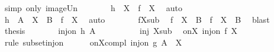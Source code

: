 \begin{isabellebody}
\ {\isacharparenleft}{\kern0pt}simp\ only{\isacharcolon}{\kern0pt}\ image{\isacharunderscore}{\kern0pt}Un{\isacharparenright}{\kern0pt}\isanewline
\ \ \ \ \isamarkupfalse%
\ \isamarkupfalse%
\ {\isachardoublequoteopen}{\isacharquery}{\kern0pt}h\ {\isacharbackquote}{\kern0pt}\ X\ {\isacharequal}{\kern0pt}\ f\ {\isacharbackquote}{\kern0pt}\ X{\isachardoublequoteclose}\ \isamarkupfalse%
\ auto\isanewline
\ \ \ \ \isamarkupfalse%
\ \isamarkupfalse%
\ {\isacharasterisk}{\kern0pt}\ \isamarkupfalse%
\ {\isachardoublequoteopen}{\isacharquery}{\kern0pt}h\ {\isacharbackquote}{\kern0pt}\ {\isacharparenleft}{\kern0pt}A\ {\isacharminus}{\kern0pt}\ X{\isacharparenright}{\kern0pt}\ {\isacharequal}{\kern0pt}\ B\ {\isacharminus}{\kern0pt}\ {\isacharparenleft}{\kern0pt}f\ {\isacharbackquote}{\kern0pt}\ X{\isacharparenright}{\kern0pt}{\isachardoublequoteclose}\ \isamarkupfalse%
\ auto\isanewline
\ \ \ \ \isamarkupfalse%
\ \isamarkupfalse%
\ fX{\isacharunderscore}{\kern0pt}sub\ \isamarkupfalse%
\ {\isachardoublequoteopen}f\ {\isacharbackquote}{\kern0pt}\ X\ {\isasymunion}\ {\isacharparenleft}{\kern0pt}B\ {\isacharminus}{\kern0pt}\ f\ {\isacharbackquote}{\kern0pt}\ X{\isacharparenright}{\kern0pt}\ {\isacharequal}{\kern0pt}\ B{\isachardoublequoteclose}\ \isamarkupfalse%
\ blast\isanewline
\ \ \ \ \isamarkupfalse%
\ \isamarkupfalse%
\ {\isacharquery}{\kern0pt}thesis\ \isacommand{{\isachardot}{\kern0pt}}\isamarkupfalse%
\isanewline
\ \ \isamarkupfalse%
\isanewline
\ \ \isamarkupfalse%
\ {\isachardoublequoteopen}inj{\isacharunderscore}{\kern0pt}on\ {\isacharquery}{\kern0pt}h\ A{\isachardoublequoteclose}\isanewline
\ \ \isamarkupfalse%
\ {\isacharminus}{\kern0pt}\isanewline
\ \ \ \ \isamarkupfalse%
\ inj{}\ X{\isacharunderscore}{\kern0pt}sub\ \isamarkupfalse%
\ on{\isacharunderscore}{\kern0pt}X{\isacharcolon}{\kern0pt}\ {\isachardoublequoteopen}inj{\isacharunderscore}{\kern0pt}on\ f\ X{\isachardoublequoteclose}\isanewline
\ \ \ \ \ \ \isamarkupfalse%
\ {\isacharparenleft}{\kern0pt}rule\ subset{\isacharunderscore}{\kern0pt}inj{\isacharunderscore}{\kern0pt}on{\isacharparenright}{\kern0pt}\isanewline
\isanewline
\ \ \ \ \isamarkupfalse%
\ on{\isacharunderscore}{\kern0pt}X{\isacharunderscore}{\kern0pt}compl{\isacharcolon}{\kern0pt}\ {\isachardoublequoteopen}inj{\isacharunderscore}{\kern0pt}on\ g{\isacharprime}{\kern0pt}\ {\isacharparenleft}{\kern0pt}A\ {\isacharminus}{\kern0pt}\ X{\isacharparenright}{\kern0pt}{\isachardoublequoteclose}\isanewline

\end{isabellebody}
